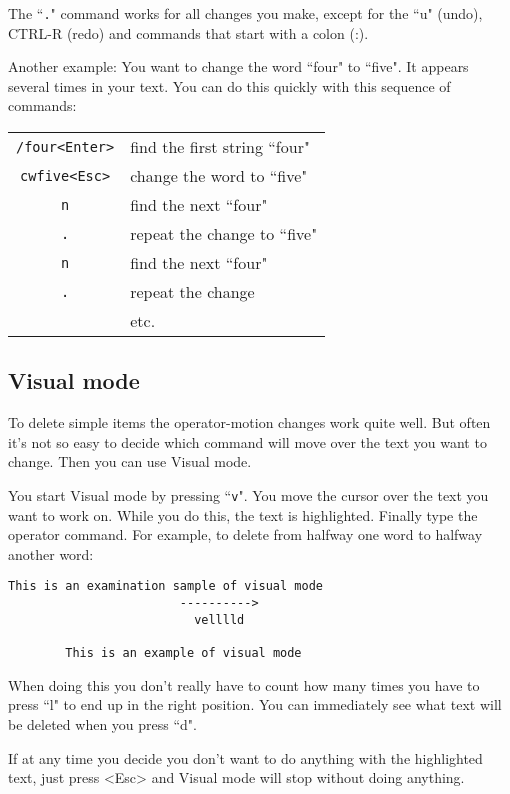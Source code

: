 The ``\texttt{.}" command works for all changes you make, except for the ``u" (undo),
CTRL-R (redo) and commands that start with a colon (:).

Another example: You want to change the word ``four" to ``five".
It appears several times in your text.
You can do this quickly with this sequence of commands:

\begin{center}
\begin{tabular}{c l}
				\texttt{/four<Enter>} & find the first string ``four"\\
				\texttt{cwfive<Esc>} & change the word to ``five"\\
				\texttt{n} & find the next ``four"\\
				\texttt{.} & repeat the change to ``five"\\
				\texttt{n} & find the next ``four"\\
				\texttt{.} & repeat the change\\
						& etc.
\end{tabular}
\end{center}

\subsection{Visual mode}

To delete simple items the operator-motion changes work quite well.
But often it's not so easy to decide which command will move over the text you want to change.
Then you can use Visual mode.

You start Visual mode by pressing ``\texttt{v}".
You move the cursor over the text you want to work on.
While you do this, the text is highlighted.
Finally type the operator command.
For example, to delete from halfway one word to halfway another word:

\begin{Verbatim}[samepage=true]
        This is an examination sample of visual mode
                        ---------->
                          velllld

        This is an example of visual mode
\end{Verbatim}

When doing this you don't really have to count how many times you have to press ``l" to end up in the right position.
You can immediately see what text will be deleted when you press ``d".

If at any time you decide you don't want to do anything with the highlighted text, just press <Esc> and Visual mode will stop without doing anything.

